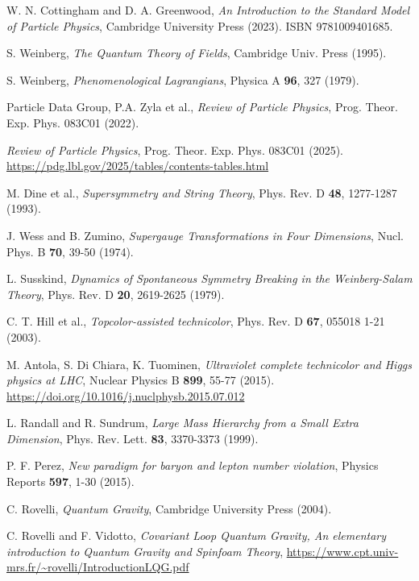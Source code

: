 \documentclass[%
  amsmath,amssymb,
  aps,
 prb,
 floatfix, showkeys
 ]{revtex4-2}
\begin{document}
 \begin{thebibliography}{99}
 
 W. N. Cottingham and D. A. Greenwood, {\it  An Introduction to the Standard Model of Particle Physics},
 Cambridge University Press (2023). ISBN 9781009401685.
 
   S. Weinberg, {\it The Quantum Theory of Fields}, Cambridge Univ. Press (1995). 
 
  S. Weinberg, {\it Phenomenological Lagrangians}, Physica A {\bf 96}, 327 (1979).
 
  Particle Data Group, P.A. Zyla et al., {\it Review of Particle Physics},
   Prog. Theor. Exp. Phys.  083C01 (2022).
 
   {\it Review of Particle Physics}, 
   Prog. Theor. Exp. Phys.  083C01 (2025). \url{https://pdg.lbl.gov/2025/tables/contents-tables.html}
 
   M. Dine et al.,
 {\it Supersymmetry and String Theory}, 
   Phys. Rev. D {\bf 48}, 1277-1287 (1993).
 
  J. Wess and B. Zumino, {\it Supergauge Transformations in Four Dimensions},
     Nucl. Phys. B  {\bf 70}, 39-50 (1974).
 
  L. Susskind,
     {\it Dynamics of Spontaneous Symmetry Breaking in the Weinberg-Salam Theory},
   Phys. Rev. D  {\bf 20}, 2619-2625 (1979).
   
   C. T. Hill et al.,
 {\it Topcolor-assisted technicolor}, 
   Phys. Rev. D {\bf 67}, 055018 1-21 (2003).
 
 M. Antola, S. Di Chiara, K. Tuominen,
 {\it Ultraviolet complete technicolor and Higgs physics at LHC},
 Nuclear Physics B {\bf 899}, 55-77 (2015). \url{https://doi.org/10.1016/j.nuclphysb.2015.07.012}
 
   L. Randall and R. Sundrum,
   {\it Large Mass Hierarchy from a Small Extra Dimension}, Phys. Rev. Lett.  {\bf 83}, 3370-3373 (1999).
 
 P. F.  Perez,
 {\it New paradigm for baryon and lepton number violation},
 Physics Reports {\bf 597},  1-30 (2015).
 
   C. Rovelli, {\it Quantum Gravity}, Cambridge University Press (2004).
 
 C. Rovelli and F. Vidotto, {\it Covariant Loop Quantum Gravity, An elementary introduction to Quantum Gravity and
   Spinfoam Theory}, \url{https://www.cpt.univ-mrs.fr/~rovelli/IntroductionLQG.pdf}
 

\end{thebibliography}
\end{document}

